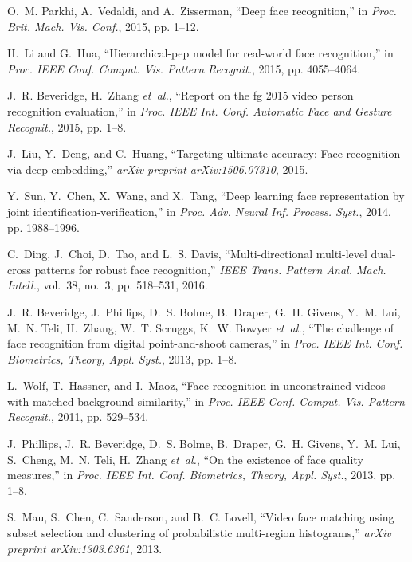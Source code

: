 \documentclass[10pt,journal,cspaper,compsoc]{IEEEtran}
\begin{document}
\begin{thebibliography}{10}
O.~M. Parkhi, A.~Vedaldi, and A.~Zisserman, ``Deep face recognition,'' in
  \emph{Proc. Brit. Mach. Vis. Conf.}, 2015, pp. 1--12.

H.~Li and G.~Hua, ``Hierarchical-pep model for real-world face recognition,''
  in \emph{Proc. IEEE Conf. Comput. Vis. Pattern Recognit.}, 2015, pp.
  4055--4064.

J.~R. Beveridge, H.~Zhang \emph{et~al.}, ``Report on the fg 2015 video person
  recognition evaluation,'' in \emph{Proc. IEEE Int. Conf. Automatic Face and
  Gesture Recognit.}, 2015, pp. 1--8.

J.~Liu, Y.~Deng, and C.~Huang, ``Targeting ultimate accuracy: Face recognition
  via deep embedding,'' \emph{arXiv preprint arXiv:1506.07310}, 2015.

Y.~Sun, Y.~Chen, X.~Wang, and X.~Tang, ``Deep learning face representation by
  joint identification-verification,'' in \emph{Proc. Adv. Neural Inf. Process.
  Syst.}, 2014, pp. 1988--1996.

C.~Ding, J.~Choi, D.~Tao, and L.~S. Davis, ``Multi-directional multi-level
  dual-cross patterns for robust face recognition,'' \emph{IEEE Trans. Pattern
  Anal. Mach. Intell.}, vol.~38, no.~3, pp. 518--531, 2016.

J.~R. Beveridge, J.~Phillips, D.~S. Bolme, B.~Draper, G.~H. Givens, Y.~M. Lui,
  M.~N. Teli, H.~Zhang, W.~T. Scruggs, K.~W. Bowyer \emph{et~al.}, ``The
  challenge of face recognition from digital point-and-shoot cameras,'' in
  \emph{Proc. IEEE Int. Conf. Biometrics, Theory, Appl. Syst.}, 2013, pp. 1--8.

L.~Wolf, T.~Hassner, and I.~Maoz, ``Face recognition in unconstrained videos
  with matched background similarity,'' in \emph{Proc. IEEE Conf. Comput. Vis.
  Pattern Recognit.}, 2011, pp. 529--534.

J.~Phillips, J.~R. Beveridge, D.~S. Bolme, B.~Draper, G.~H. Givens, Y.~M. Lui,
  S.~Cheng, M.~N. Teli, H.~Zhang \emph{et~al.}, ``On the existence of face
  quality measures,'' in \emph{Proc. IEEE Int. Conf. Biometrics, Theory, Appl.
  Syst.}, 2013, pp. 1--8.

S.~Mau, S.~Chen, C.~Sanderson, and B.~C. Lovell, ``Video face matching using
  subset selection and clustering of probabilistic multi-region histograms,''
  \emph{arXiv preprint arXiv:1303.6361}, 2013.


\end{thebibliography}
\end{document}
